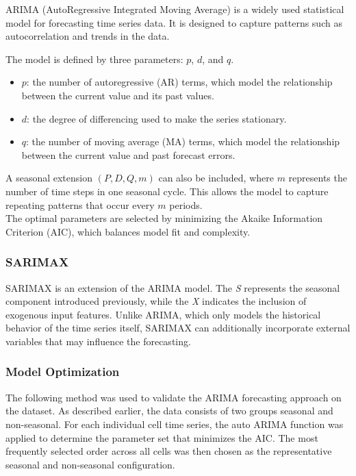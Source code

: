 ARIMA (AutoRegressive Integrated Moving Average) is a widely used statistical model for forecasting time series data. It is designed to capture patterns such as autocorrelation and trends in the data.

The model is defined by three parameters: $p$, $d$, and $q$.
\begin{itemize}
    \item $p$: the number of autoregressive (AR) terms, which model the relationship between the current value and its past values.
    \item $d$: the degree of differencing used to make the series stationary.
    \item $q$: the number of moving average (MA) terms, which model the relationship between the current value and past forecast errors.
\end{itemize}

A seasonal extension $(P, D, Q, m)$ can also be included, where $m$ represents the number of time steps in one seasonal cycle. This allows the model to capture repeating patterns that occur every $m$ periods. \\

The optimal parameters are selected by minimizing the Akaike Information Criterion (AIC), which balances model fit and complexity. \cite{AIC_paper} \\

\subsubsection{SARIMAX}
SARIMAX is an extension of the ARIMA model. The \textit{S} represents the seasonal component introduced previously, while the \textit{X} indicates the inclusion of exogenous input features. Unlike ARIMA, which only models the historical behavior of the time series itself, SARIMAX can additionally incorporate external variables that may influence the forecasting.

\subsubsection{Model Optimization}

The following method was used to validate the ARIMA forecasting approach on the dataset. As described earlier, the data consists of two groups seasonal and non-seasonal. For each individual cell time series, the auto ARIMA function \cite{forecasting_book} was applied to determine the parameter set that minimizes the AIC. The most frequently selected order across all cells was then chosen as the representative seasonal and non-seasonal configuration. \\

